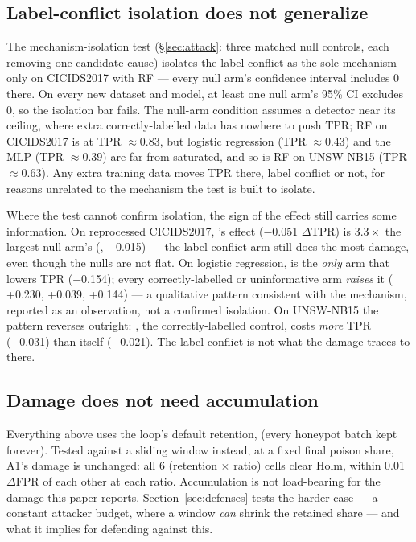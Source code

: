 \subsection{Label-conflict isolation does not generalize}
The mechanism-isolation test (\S\ref{sec:attack}: three matched null controls, each removing one
candidate cause) isolates the label conflict as the sole mechanism only on CICIDS2017 with RF —
every null arm's confidence interval includes 0 there. On every new dataset and model, at least
one null arm's 95\% CI excludes 0, so the isolation bar fails. The null-arm condition assumes a
detector near its ceiling, where extra correctly-labelled data has nowhere to push TPR; RF on
CICIDS2017 is at TPR $\approx 0.83$, but logistic regression (TPR $\approx 0.43$) and the MLP
(TPR $\approx 0.39$) are far from saturated, and so is RF on UNSW-NB15 (TPR $\approx 0.63$). Any
extra training data moves TPR there, label conflict or not, for reasons unrelated to the
mechanism the test is built to isolate.

Where the test cannot confirm isolation, the sign of the effect still carries some information.
On reprocessed CICIDS2017, 's effect (−0.051 $\Delta$TPR) is $3.3\times$ the largest
null arm's (, −0.015) — the label-conflict arm still does the most damage, even
though the nulls are not flat. On logistic regression,  is the \emph{only} arm that
lowers TPR (−0.154); every correctly-labelled or uninformative arm \emph{raises} it
( +0.230,  +0.039,  +0.144) — a qualitative pattern consistent
with the mechanism, reported as an observation, not a confirmed isolation. On UNSW-NB15 the
pattern reverses outright: , the correctly-labelled control, costs \emph{more} TPR
(−0.031) than  itself (−0.021). The label conflict is not what the damage traces to
there.

\subsection{Damage does not need accumulation}
Everything above uses the loop's default retention,  (every honeypot batch kept
forever). Tested against a sliding window instead, at a fixed final poison share, A1's damage is
unchanged: all 6 (retention $\times$ ratio) cells clear Holm, within 0.01 $\Delta$FPR of each
other at each ratio. Accumulation is not load-bearing for the damage this paper reports.
Section~\ref{sec:defenses} tests the harder case — a constant attacker budget, where a window
\emph{can} shrink the retained share — and what it implies for defending against this.

